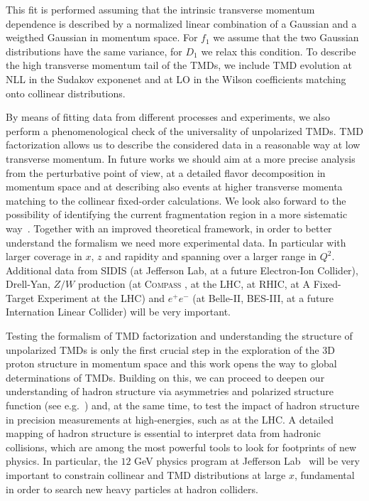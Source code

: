 \documentclass[aps,preprintnumbers,showpacs,nofootinbib,superscriptaddress,floatfix]{revtex4}
\newcommand{\compass}{\textsc{Compass }}
\begin{document}
This fit is performed assuming that the intrinsic transverse momentum dependence is described by a normalized linear combination of a Gaussian and a weigthed Gaussian in momentum space. For $f_1$ we assume that the two Gaussian distributions have the same variance, for $D_1$ we relax this condition.  To describe the high transverse momentum tail of the TMDs, we include TMD evolution at NLL in the Sudakov exponenet and at LO in the Wilson coefficients matching onto collinear distributions.

By means of fitting data from different processes and experiments, we also perform a phenomenological check of the universality of unpolarized TMDs. 
TMD factorization allows us to describe the considered data in a reasonable way at low transverse momentum. In future works we should aim at a more precise analysis from the perturbative point of view, at a detailed flavor decomposition in momentum space and at describing also events at higher transverse momenta matching to the collinear fixed-order calculations. We look also forward to the possibility of identifying the current fragmentation region in a more sistematic way~\cite{Boglione:2016bph}.
Together with an improved theoretical framework, in order to better understand the formalism we need more experimental data. In particular with larger coverage in $x$, $z$ and rapidity and spanning over a larger range in $Q^2$. 
Additional data from SIDIS (at Jefferson Lab, at a future Electron-Ion Collider), Drell-Yan, $Z/W$ production (at \compass, at the LHC, at RHIC, at A Fixed-Target Experiment at the LHC) and $e^+e^-$ (at Belle-II, BES-III, at a future Internation Linear Collider) will be very important. 

Testing the formalism of TMD factorization and understanding the structure of unpolarized TMDs is only the first crucial step in the exploration of the 3D proton structure in momentum space and this work opens the way to global determinations of TMDs. 
Building on this, we can proceed to deepen our understanding of hadron structure via asymmetries and polarized structure function (see e.g.~\cite{Aschenauer:2015ndk,Boglione:2015zyc,Kikola:2017hnp}) and, at the same time, to test the impact of hadron structure in precision measurements at high-energies, such as at the LHC. A detailed mapping of hadron structure is essential to interpret data from hadronic collisions, which are among the most powerful tools to look for footprints of new physics.
In particular, the $12$ GeV physics program at Jefferson Lab~\cite{Dudek:2012vr} will be very important to constrain collinear and TMD distributions at large $x$, fundamental in order to search new heavy particles at hadron colliders.
\end{document}
